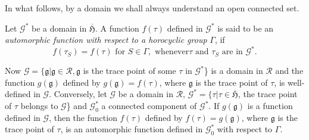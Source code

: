 In what follows, by a domain we shall always understand an open
connected set.

\begin{defi*}
Let $\mathcal{G}^{\ast}$ be a domain in $\overline{\mathfrak{H}}$. A
function $f(\tau)$ defined in $\mathcal{G}^{\ast}$ is said to be an
\textit{automorphic function with respect to a horocyclic group}
$\Gamma$, if 
$$
f(\tau_S) = f(\tau) \text{ for } S \in \Gamma, \text{ whenever
} \tau \text{ and } \tau_S \text{ are in } \mathcal{G}^{\ast}.
$$
\end{defi*}

Now $\mathcal{G} = \{\mathfrak{g}|\mathfrak{g} \in
\mathscr{R}, \mathfrak{g}$ is the trace point of some $\tau$ in
$\mathcal{G}^{\ast}$\} is a domain in $\mathscr{R}$ and the function
$g(\mathfrak{g})$ defined by $g(\mathfrak{g}) = f(\tau)$, where
$\mathfrak{g}$ is the trace point of $\tau$, is well-defined in
$\mathcal{G}$. Conversely, let $\mathcal{G}$ be a domain
\pageoriginale in $\mathscr{R}$, $\mathcal{G}^{\ast}=\{\tau|\tau
\in \overline{\mathfrak{H}}$, the trace point of $\tau$
belongs to $\mathcal{G}$\} and $\mathcal{G}^{\ast}_0$ a connected
component of $\mathcal{G}^{\ast}$. If $g(\mathfrak{g})$ is a function
defined in $\mathcal{G}$, then the function $f(\tau)$ defined by
$f(\tau)=g(\mathfrak{g})$, where $\mathfrak{g}$ is the trace point of
$\tau$, is an automorphic function defined in $\mathcal{G}^{\ast}_0$
with respect to $\Gamma$. 

